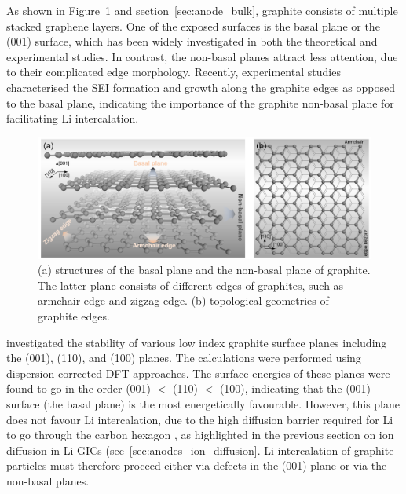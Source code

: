 \documentclass[../main.tex]{subfiles}
\begin{document}
As shown in Figure~\ref{fig:graphite_surfs} and section~\ref{sec:anode_bulk}, graphite consists of multiple stacked graphene layers. One of the exposed surfaces is the basal plane or the (001) surface, which has been widely investigated in both the theoretical and experimental studies.\cite{thinius2014theoretical,persson2010,toyoura2010effects,yao2012diffusion,nuli2006intercalation} In contrast, the non-basal planes attract less attention, due to their complicated edge morphology. Recently, experimental studies characterised the SEI formation and growth along the graphite edges as opposed to the basal plane, \cite{liu2019situ,zhang2020operando} indicating the importance of the graphite non-basal plane for facilitating Li intercalation.

\begin{figure}
    \centering
    \includegraphics[scale=0.4]{figures/Graphite_surfs.png}
    \caption{(a) structures of the basal plane and the non-basal plane of graphite. The latter plane consists of different edges of graphites, such as armchair edge and zigzag edge. (b) topological geometries of graphite edges.}
    \label{fig:graphite_surfs}
\end{figure}

\citeauthor{Rana-Graphite-Surf} investigated the stability of various low index graphite surface planes including the (001), (110), and (100) planes. The calculations were performed using dispersion corrected DFT approaches.\cite{Grimme-2,Grimme-4} The surface energies of these planes were found to go in the order (001) $<$ (110) $<$ (100), \cite{Rana-Graphite-Surf} indicating that the (001) surface (the basal plane) is the most energetically favourable. However, this plane does not favour Li intercalation, due to the high diffusion barrier required for Li to go through the carbon hexagon \cite{thinius2014theoretical,persson2010}, as highlighted in the previous section on ion diffusion in Li-GICs (sec~\ref{sec:anodes_ion_diffusion}. Li intercalation of graphite particles must therefore proceed either via defects in the (001) plane or via the non-basal planes.
\end{document}
